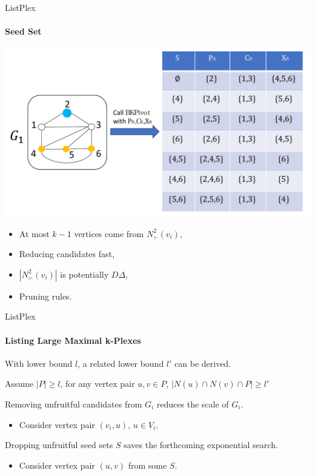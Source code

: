 \documentclass[9pt,notheorems]{beamer} %
\begin{document}
\begin{frame}{ListPlex}
    \framesubtitle{Seed Set}
    \centering
    \includegraphics[width=0.8\linewidth]{pic/seeds.pdf}
    \begin{minipage}{0.45\linewidth}
        \begin{itemize}
            \item At most $k-1$ vertices come from $N^2_{\succ}(v_i)$,
            \item Reducing candidates fast,
        \end{itemize}
    \end{minipage}
    \begin{minipage}{0.45\linewidth}
        \begin{itemize}
            \item $|N^2_{\succ}(v_i)|$ is potentially $D\Delta$,
            \item Pruning rules.
        \end{itemize}
    \end{minipage}
\end{frame}
\begin{frame}{ListPlex}
    \framesubtitle{Listing Large Maximal k-Plexes}
    With lower bound $l$, a related lower bound $l'$ can be derived.
    \begin{lemma}
        Assume $|P|\ge l$, for any vertex pair $u,v \in P$,  $|N(u)\cap N(v) \cap P| \ge l'$
    \end{lemma}
    \vspace{0.25cm}
    Removing unfruitful candidates from $G_i$ reduces the scale of $G_i$.\\
    \begin{itemize}
        \item Consider vertex pair $(v_i,u)$, $u \in V_i$.
    \end{itemize}    
    \vspace{0.25cm}
    Dropping unfruitful seed sets $S$ saves the forthcoming exponential search.
    \begin{itemize}
        \item Consider vertex pair $(u,v)$ from some $S$.
    \end{itemize}       
\end{frame}
\end{document}
